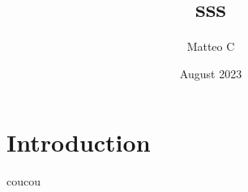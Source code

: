 \documentclass{article}
\title{sss}
\author{Matteo C }
\date{August 2023}
\begin{document}
\maketitle

\section{Introduction}
coucou
\end{document}
